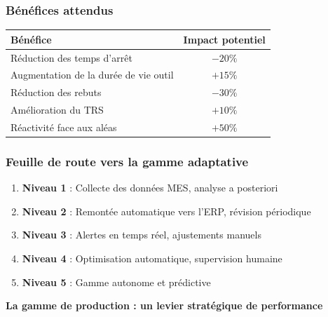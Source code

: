 \documentclass{article}
\begin{document}
\begin{table}[h]
\subsubsection{Bénéfices attendus}

\begin{table}[h]
\centering
\begin{tabular}{|l|c|}
\hline
\textbf{Bénéfice} & \textbf{Impact potentiel} \\
\hline
Réduction des temps d'arrêt & $-20\%$ \\
Augmentation de la durée de vie outil & $+15\%$ \\
Réduction des rebuts & $-30\%$ \\
Amélioration du TRS & $+10\%$ \\
Réactivité face aux aléas & $+50\%$ \\
\hline
\end{tabular}
\end{table}

\subsubsection{Feuille de route vers la gamme adaptative}

\begin{tcolorbox}[colback=grisclair, colframe=gray!70!black, title=Plan d'évolution]
\begin{enumerate}
    \item \textbf{Niveau 1} : Collecte des données MES, analyse a posteriori
    \item \textbf{Niveau 2} : Remontée automatique vers l'ERP, révision périodique
    \item \textbf{Niveau 3} : Alertes en temps réel, ajustements manuels
    \item \textbf{Niveau 4} : Optimisation automatique, supervision humaine
    \item \textbf{Niveau 5} : Gamme autonome et prédictive
\end{enumerate}
\end{tcolorbox}


\begin{tcolorbox}[colback=blueclair, colframe=blue!70!black, title=Conclusion Générale]
\begin{center}
\textbf{La gamme de production : un levier stratégique de performance}
\end{center}
\vspace{0.5em}


\end{tcolorbox}
\end{table}
\end{document}
